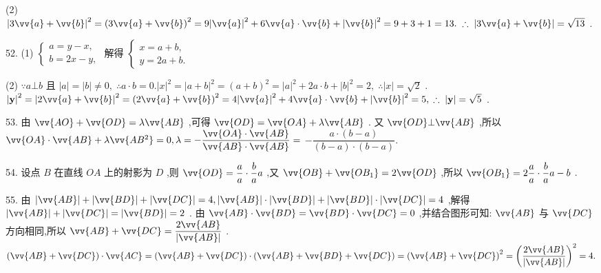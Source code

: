 (2) ${\left| 3\vv{a} + \vv{b}\right| }^{2} = {\left( 3\vv{a} + \vv{b}\right) }^{2} = 9{\left| \vv{a}\right| }^{2} + 6\vv{a} \cdot  \vv{b} + {\left| \vv{b}\right| }^{2} = 9 + 3 + 1 = {13}.\;\therefore \;\left| {3\vv{a} + \vv{b}}\right|  = \sqrt{13}$ .

52. (1) $\left\{  \begin{array}{l} a = y - x, \\  b = {2x} - y, \end{array}\right.$ 解得 $\left\{  \begin{array}{l} x = a + b, \\  y = {2a} + b. \end{array}\right.$

(2) $\because a \bot  b$ 且 $\left| a\right|  = \left| b\right|  \neq  0,\;\therefore a \cdot  b = 0.{\left| x\right| }^{2} = {\left| a + b\right| }^{2} = {\left( a + b\right) }^{2} = {\left| a\right| }^{2} + {2a} \cdot  b + {\left| b\right| }^{2} = 2,\;\therefore \left| x\right|  = \sqrt{2}$ . ${\left| \mathbf{y}\right| }^{2} = {\left| 2\vv{a} + \vv{b}\right| }^{2} = {\left( 2\vv{a} + \vv{b}\right) }^{2} = 4{\left| \vv{a}\right| }^{2} + 4\vv{a} \cdot  \vv{b} + {\left| \vv{b}\right| }^{2} = 5,\;\therefore \;\left| \mathbf{y}\right|  = \sqrt{5}$ .

53. 由 $\vv{AO} + \vv{OD} = \lambda \vv{AB}$ ,可得 $\vv{OD} = \vv{OA} + \lambda \vv{AB}$ . 又 $\vv{OD} \bot  \vv{AB}$ ,所以 $\vv{OA} \cdot  \vv{AB} + \lambda \vv{A{B}^{2}} = 0,\lambda  =  - \dfrac{\vv{OA} \cdot  \vv{AB}}{\vv{AB} \cdot  \vv{AB}} =$  $- \dfrac{a \cdot  \left( {b - a}\right) }{\left( {b - a}\right)  \cdot  \left( {b - a}\right) }.$

54. 设点 $B$ 在直线 ${OA}$ 上的射影为 $D$ ,则 $\vv{OD} = \dfrac{a}{a} \cdot  \dfrac{b}{a}a$ ,又 $\vv{OB} + \vv{O{B}_{1}} = 2\vv{OD}$ ,所以 $\vv{O{B}_{1}} = 2\dfrac{a}{a} \cdot  \dfrac{b}{a}a - b$ .

55. 由 $\left| \vv{AB}\right|  + \left| \vv{BD}\right|  + \left| \vv{DC}\right|  = 4,\left| \vv{AB}\right|  \cdot  \left| \vv{BD}\right|  + \left| \vv{BD}\right|  \cdot  \left| \vv{DC}\right|  = 4$ ,解得 $\left| \vv{AB}\right|  + \left| \vv{DC}\right|  = \left| \vv{BD}\right|  = 2$ . 由 $\vv{AB} \cdot  \vv{BD} = \vv{BD} \cdot  \vv{DC} = 0$ ,并结合图形可知: $\vv{AB}$ 与 $\vv{DC}$ 方向相同,所以 $\vv{AB} + \vv{DC} = \dfrac{2\vv{AB}}{\left| \vv{AB}\right| }$ . $\left( {\vv{AB} + \vv{DC}}\right)  \cdot  \vv{AC} = \left( {\vv{AB} + \vv{DC}}\right)  \cdot  \left( {\vv{AB} + \vv{BD} + \vv{DC}}\right)  = {\left( \vv{AB} + \vv{DC}\right) }^{2} = {\left( \dfrac{2\vv{AB}}{\left| \vv{AB}\right| }\right) }^{2} = 4.$

